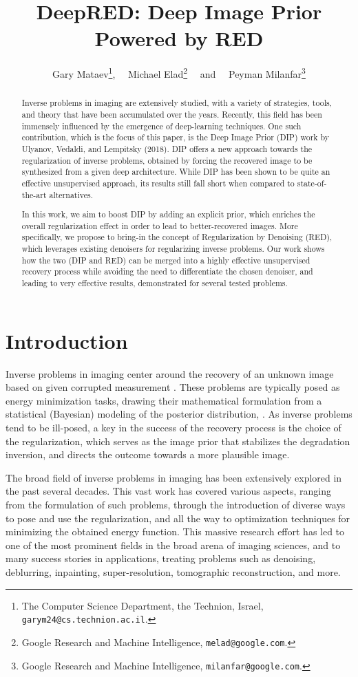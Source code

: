 \documentclass[12pt]{article}
\title{DeepRED: Deep Image Prior Powered by RED}
\author{Gary Mataev\thanks{The Computer Science Department, the Technion, Israel, \texttt{garym24@cs.technion.ac.il}.}, ~~Michael Elad\thanks{Google Research and Machine Intelligence, \texttt{melad@google.com}.}  ~~and ~~Peyman Milanfar\thanks{Google Research and Machine Intelligence, \texttt{milanfar@google.com}.}}
\begin{document}
\maketitle

\begin{abstract}
Inverse problems in imaging are extensively studied, with a variety of strategies, tools, and theory that have been accumulated over the years. Recently, this field has been immensely influenced by the emergence of deep-learning techniques. One such contribution, which is the focus of this paper, is the Deep Image Prior (DIP) work by Ulyanov, Vedaldi, and Lempitsky (2018). DIP offers a new approach towards the regularization of inverse problems, obtained by forcing the recovered image to be synthesized from a given  deep architecture. While DIP has been shown to be quite an effective unsupervised approach, its results still fall short when compared to state-of-the-art alternatives.

In this work, we aim to boost DIP by adding an explicit prior, which enriches the overall regularization effect in order to lead to better-recovered images. More specifically, we propose to bring-in the concept of Regularization by Denoising (RED), which leverages existing denoisers for regularizing inverse problems. Our work shows how the two (DIP and RED) can be merged into a highly effective unsupervised recovery process while avoiding the need to differentiate the chosen denoiser, and leading to very effective results, demonstrated for several tested problems.

\end{abstract}
\vspace{0.5in}


\section{Introduction}
\label{sec:Intro}

Inverse problems in imaging center around the recovery of an unknown image  based on given corrupted measurement . These problems are typically posed as energy minimization tasks,  drawing their mathematical formulation from a statistical (Bayesian) modeling of the posterior distribution, . As inverse problems tend to be ill-posed, a key in the success of the recovery process is the choice of the regularization, which serves as the image prior that stabilizes the degradation inversion, and directs the outcome towards a more plausible image.

The broad field of inverse problems in imaging has been extensively explored in the past several decades. This vast work has covered various aspects, ranging from the formulation of such problems, through the introduction of diverse ways to pose and use the regularization, and all the way to optimization techniques for minimizing the obtained energy function. This massive research effort has led to one of the most prominent fields in the broad arena of imaging sciences, and to many success stories in applications, treating problems such as denoising, deblurring, inpainting, super-resolution, tomographic reconstruction, and more.
\end{document}
